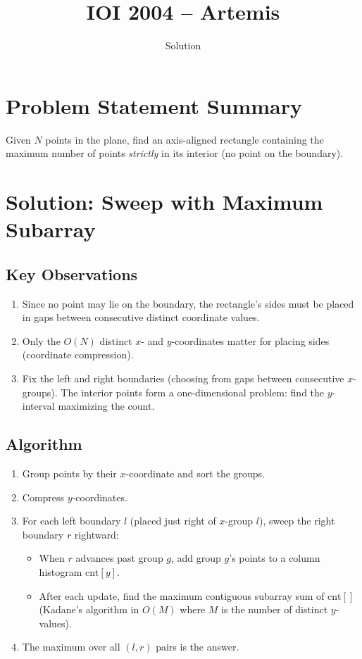 \documentclass[11pt,a4paper]{article}
\title{IOI 2004 -- Artemis}
\author{Solution}
\date{}
\begin{document}
\maketitle

\section{Problem Statement Summary}
Given $N$ points in the plane, find an axis-aligned rectangle containing
the maximum number of points \emph{strictly} in its interior (no point
on the boundary).

\section{Solution: Sweep with Maximum Subarray}

\subsection{Key Observations}
\begin{enumerate}
  \item Since no point may lie on the boundary, the rectangle's sides
        must be placed in gaps between consecutive distinct coordinate
        values.
  \item Only the $O(N)$ distinct $x$- and $y$-coordinates matter for
        placing sides (coordinate compression).
  \item Fix the left and right boundaries (choosing from gaps between
        consecutive $x$-groups). The interior points form a
        one-dimensional problem: find the $y$-interval maximizing the
        count.
\end{enumerate}

\subsection{Algorithm}
\begin{enumerate}
  \item Group points by their $x$-coordinate and sort the groups.
  \item Compress $y$-coordinates.
  \item For each left boundary $l$ (placed just right of
        $x$-group $l$), sweep the right boundary $r$ rightward:
        \begin{itemize}
          \item When $r$ advances past group $g$, add group $g$'s
                points to a column histogram $\mathrm{cnt}[y]$.
          \item After each update, find the maximum contiguous subarray
                sum of $\mathrm{cnt}[]$ (Kadane's algorithm in $O(M)$
                where $M$ is the number of distinct $y$-values).
        \end{itemize}
  \item The maximum over all $(l, r)$ pairs is the answer.
\end{enumerate}
\end{document}
